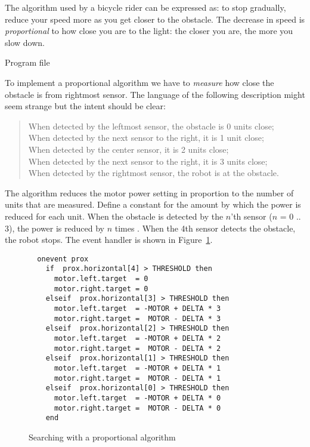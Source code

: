 The algorithm used by a bicycle rider can be expressed as: to
stop gradually, reduce your speed more as you get closer to the
obstacle. The decrease in speed is
\emph{proportional} to how close you are to the light: the closer you
are, the more you slow down.

{\raggedleft \hfill Program file }

To implement a proportional algorithm we have to \emph{measure} how
close the obstacle is from rightmost sensor. The language of the
following description might seem strange but the intent should be clear:

\begin{quote}
When detected by the leftmost sensor, the obstacle is 0 units close;\\
When detected by the next sensor to the right, it is 1 unit close;\\
When detected by the center sensor, it is 2 units close;\\
When detected by the next sensor to the right, it is 3 units close;\\
When detected by the rightmost sensor, the robot is at the obstacle.
\end{quote}

The algorithm reduces the motor power setting in proportion to the
number of units that are measured. Define a constant  for the
amount by which the power is reduced for each unit. When the obstacle is
detected by the $n$'th sensor ($n$ = 0 .. 3), the power is reduced by
$n$ times . When the 4th sensor detects the obstacle, the robot stops.
The event handler is shown in
Figure~\ref{f.pro}.

\begin{figure}
\begin{verbatim}
  onevent prox
    if  prox.horizontal[4] > THRESHOLD then
      motor.left.target  = 0
      motor.right.target = 0
    elseif  prox.horizontal[3] > THRESHOLD then
      motor.left.target  = -MOTOR + DELTA * 3
      motor.right.target =  MOTOR - DELTA * 3
    elseif  prox.horizontal[2] > THRESHOLD then
      motor.left.target  = -MOTOR + DELTA * 2
      motor.right.target =  MOTOR - DELTA * 2
    elseif  prox.horizontal[1] > THRESHOLD then
      motor.left.target  = -MOTOR + DELTA * 1
      motor.right.target =  MOTOR - DELTA * 1
    elseif  prox.horizontal[0] > THRESHOLD then
      motor.left.target  = -MOTOR + DELTA * 0
      motor.right.target =  MOTOR - DELTA * 0
    end
\end{verbatim}
\caption{Searching with a proportional algorithm}\label{f.pro}
\end{figure}

